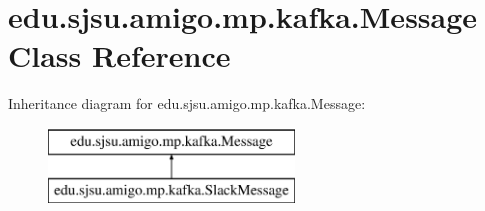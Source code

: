 \hypertarget{classedu_1_1sjsu_1_1amigo_1_1mp_1_1kafka_1_1_message}{}\section{edu.\+sjsu.\+amigo.\+mp.\+kafka.\+Message Class Reference}
\label{classedu_1_1sjsu_1_1amigo_1_1mp_1_1kafka_1_1_message}
Inheritance diagram for edu.\+sjsu.\+amigo.\+mp.\+kafka.\+Message\+:\begin{figure}[H]
\begin{center}
\leavevmode
\includegraphics[height=2.000000cm]{classedu_1_1sjsu_1_1amigo_1_1mp_1_1kafka_1_1_message}
\end{center}
\end{figure}
